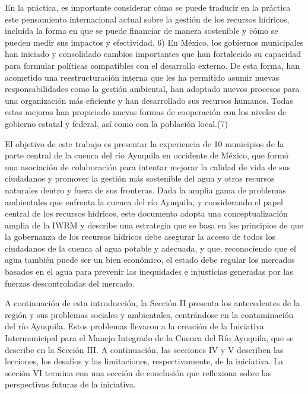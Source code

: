     En la práctica, es importante considerar cómo se puede traducir en la práctica este pensamiento internacional actual sobre la gestión de los recursos hídricos, incluida la forma en que se puede financiar de manera sostenible y cómo se pueden medir sus impactos y efectividad. 6) En México, los gobiernos municipales han iniciado y consolidado cambios importantes que han fortalecido su capacidad para formular políticas compatibles con el desarrollo externo. De esta forma, han acometido una reestructuración interna que les ha permitido asumir nuevas responsabilidades como la gestión ambiental, han adoptado nuevos procesos para una organización más eficiente y han desarrollado sus recursos humanos. Todas estas mejoras han propiciado nuevas formas de cooperación con los niveles de gobierno estatal y federal, así como con la población local.(7)
    
    El objetivo de este trabajo es presentar la experiencia de 10 municipios de la parte central de la cuenca del río Ayuquila en occidente de México, que formó una asociación de colaboración para intentar mejorar la calidad de vida de sus ciudadanos y promover la gestión más sostenible del agua y otros recursos naturales dentro y fuera de sus fronteras. Dada la amplia gama de problemas ambientales que enfrenta la cuenca del río Ayuquila, y considerando el papel central de los recursos hídricos, este documento adopta una conceptualización amplia de la IWRM y describe una estrategia que se basa en los principios de que la gobernanza de los recursos hídricos debe asegurar la acceso de todos los ciudadanos de la cuenca al agua potable y adecuada, y que, reconociendo que el agua también puede ser un bien económico, el estado debe regular los mercados basados en el agua para prevenir las inequidades e injusticias generadas por las fuerzas descontroladas del mercado.
    
    A continuación de esta introducción, la Sección II presenta los antecedentes de la región y sus problemas sociales y ambientales, centrándose en la contaminación del río Ayuquila. Estos problemas llevaron a la creación de la Iniciativa Intermunicipal para el Manejo Integrado de la Cuenca del Río Ayuquila, que se describe en la Sección III. A continuación, las secciones IV y V describen las lecciones, los desafíos y las limitaciones, respectivamente, de la iniciativa. La sección VI termina con una sección de conclusión que reflexiona sobre las perspectivas futuras de la iniciativa.
